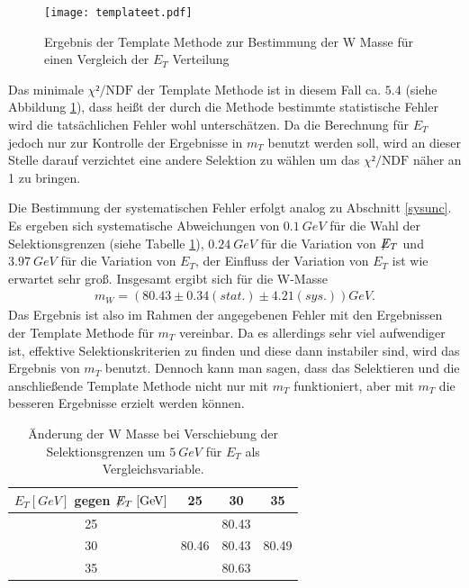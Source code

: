 \documentclass[a4paper,12pt]{article}
\newcommand{\met}{\ensuremath{\not\mathrel{E}}_T}
\begin{document}
\begin{figure}[htb]
	\centering
	\texttt{[image: templateet.pdf]}
	\caption{Ergebnis der Template Methode zur Bestimmung der W Masse für einen Vergleich der $E_{T}$ Verteilung}
	\label{fig:chiet}
\end{figure}
Das minimale $χ²/\text{NDF}$ der Template Methode ist in diesem Fall ca. $5.4$ (siehe Abbildung
\ref{fig:chiet}), dass heißt der durch die Methode bestimmte statistische Fehler wird
die tatsächlichen Fehler wohl unterschätzen. Da die Berechnung für $E_{T}$ jedoch nur zur Kontrolle der Ergebnisse in $m_{T}$ benutzt werden soll,
wird an dieser Stelle darauf verzichtet eine andere Selektion zu wählen um das $χ²/\text{NDF}$ näher an 1 zu bringen.

Die Bestimmung der systematischen Fehler erfolgt analog zu
Abschnitt \ref{sysunc}. Es ergeben sich systematische Abweichungen von $\SI{0.1}{GeV}$ für die Wahl der Selektionsgrenzen (siehe Tabelle \ref{tab:variation_et}), $\SI{0.24}{GeV}$
für die Variation von $\met$ und $\SI{3.97}{GeV}$ für die Variation von $E_{T}$, der Einfluss der Variation von $E_{T}$ ist wie erwartet sehr groß.
Insgesamt ergibt sich für die W-Masse
\begin{align*}
	m_W = ( 80.43 ± 0.34 (stat.)± 4.21 (sys.)) \si{GeV}.
\end{align*}
Das Ergebnis ist also im Rahmen der angegebenen Fehler mit den Ergebnissen der Template Methode für
$m_{T}$ vereinbar.
Da es allerdings sehr viel aufwendiger ist, effektive Selektionskriterien zu finden und diese dann
instabiler sind, wird das Ergebnis von $m_T$ benutzt.
Dennoch kann man sagen, dass das Selektieren und die anschließende Template Methode nicht nur mit
$m_T$ funktioniert, aber mit $m_T$ die besseren Ergebnisse erzielt werden können.
\begin{table}[h]
	\centering
	\begin{tabular}{c| c c c}
		$E_{T} [\si{GeV}]$ gegen $\met[\si{GeV}]$ & 25 & 30 & 35 \\
		\hline
		25 &  & 80.43 & \\
		30 & 80.46 & 80.43 & 80.49 \\
		35 &  & 80.63 &
	\end{tabular}
	\caption{Änderung der W Masse bei Verschiebung der Selektionsgrenzen um $\SI{5}{GeV}$ für $E_T$
als Vergleichsvariable.}
	\label{tab:variation_et}
\end{table}
\end{document}
